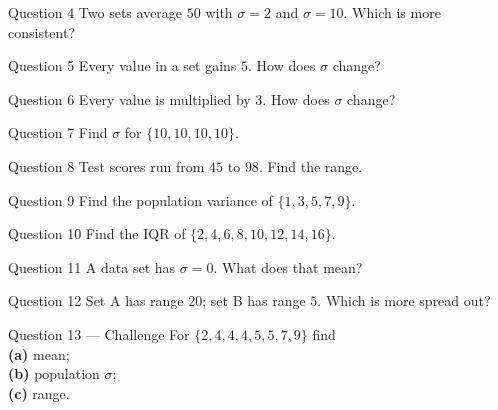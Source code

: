 \documentclass[11pt]{article}
\begin{document}
\begin{qbox}{Question 4}
Two sets average $50$ with $\sigma=2$ and $\sigma=10$. Which is more consistent?\workspace{2.4cm}
\end{qbox}

\begin{qbox}{Question 5}
Every value in a set gains $5$. How does $\sigma$ change?\workspace{2.4cm}
\end{qbox}

\begin{qbox}{Question 6}
Every value is multiplied by $3$. How does $\sigma$ change?\workspace{2.4cm}
\end{qbox}

\begin{qbox}{Question 7}
Find $\sigma$ for $\{10,10,10,10\}$.\workspace{2.4cm}
\end{qbox}

\begin{qbox}{Question 8}
Test scores run from $45$ to $98$. Find the range.\workspace{2.4cm}
\end{qbox}

\begin{qbox}{Question 9}
Find the population variance of $\{1,3,5,7,9\}$.\workspace{2.4cm}
\end{qbox}

\begin{qbox}{Question 10}
Find the IQR of $\{2,4,6,8,10,12,14,16\}$.\workspace{2.4cm}
\end{qbox}

\begin{qbox}{Question 11}
A data set has $\sigma=0$. What does that mean?\workspace{2.4cm}
\end{qbox}

\begin{qbox}{Question 12}
Set A has range $20$; set B has range $5$. Which is more spread out?\workspace{2.4cm}
\end{qbox}

\begin{qbox}{Question 13 --- Challenge}
For $\{2,4,4,4,5,5,7,9\}$ find \\ \textbf{(a)} mean; \\ \textbf{(b)} population $\sigma$; \\ \textbf{(c)} range.\workspace{3cm}
\end{qbox}

\clearpage
{}
\end{document}
